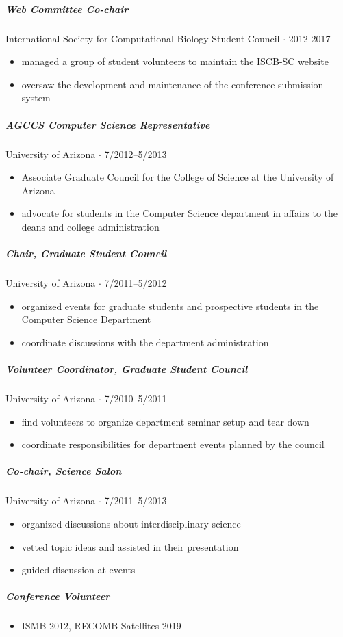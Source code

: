 \documentclass[10pt,letterpaper]{article}
\newcommand{\bigdot}{$\cdot$\xspace}
\begin{document}
\subparagraph{Web Committee Co-chair}
International Society for Computational Biology Student Council  \bigdot 2012-2017
\begin{itemize}
    \item managed a group of student volunteers to maintain the ISCB-SC website
    \item oversaw the development and maintenance of the conference submission system
\end{itemize}

\subparagraph{AGCCS Computer Science Representative}
University of Arizona \bigdot 7/2012--5/2013
\begin{itemize}
    \item Associate Graduate Council for the College of Science at the University of Arizona
    \item advocate for students in the Computer Science department in affairs to the deans and college administration
\end{itemize}

\subparagraph{Chair, Graduate Student Council}
University of Arizona \bigdot 7/2011--5/2012
\begin{itemize}
    \item organized events for graduate students and prospective students in the Computer Science Department
    \item coordinate discussions with the department administration
\end{itemize}

\subparagraph{Volunteer Coordinator, Graduate Student Council}
University of Arizona \bigdot 7/2010--5/2011
\begin{itemize}
    \item find volunteers to organize department seminar setup and tear down
    \item coordinate responsibilities for department events planned by the council
\end{itemize}

\subparagraph{Co-chair, Science Salon}
University of Arizona \bigdot 7/2011--5/2013
\begin{itemize}
    \item organized discussions about interdisciplinary science
    \item vetted topic ideas and assisted in their presentation
    \item guided discussion at events
\end{itemize}

\subparagraph{Conference Volunteer}
\begin{itemize}
	\item ISMB 2012, RECOMB Satellites 2019
\end{itemize}
\end{document}
